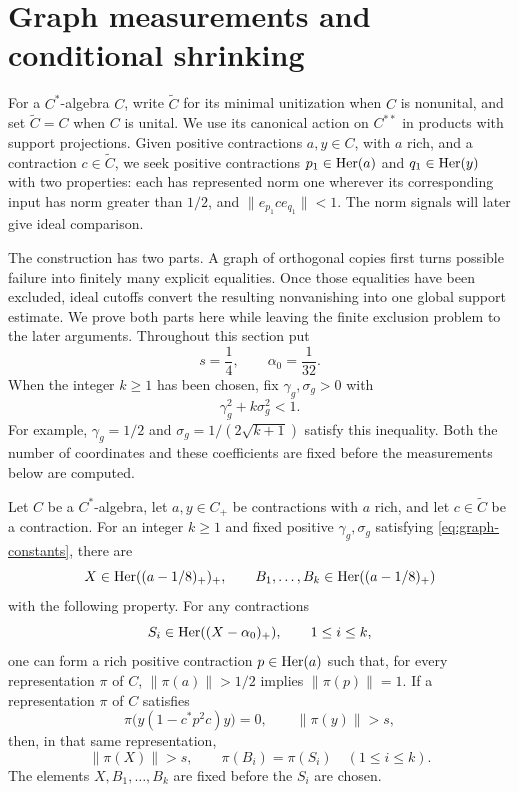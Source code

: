 \section{Graph measurements and conditional shrinking}\label{sec:graph}

For a \(C^*\)-algebra \(C\), write \(\widetilde C\) for its
minimal unitization when \(C\) is nonunital, and set
\(\widetilde C=C\) when \(C\) is unital.  We use its canonical
action on \(C^{**}\) in products with support projections.
Given positive contractions \(a,y\in C\), with \(a\) rich,
and a contraction \(c\in\widetilde C\), we seek positive
contractions \(p_1\in\operatorname{Her}(a)\) and \(q_1\in\operatorname{Her}(y)\) with two
properties: each has represented norm one wherever its corresponding
input has norm greater than \(1/2\), and
\(\|e_{p_1}ce_{q_1}\|<1\).  The norm signals will later give
ideal comparison.

The construction has two parts.  A graph of orthogonal copies
first turns possible failure into finitely many explicit equalities.
Once those equalities have been excluded, ideal cutoffs convert
the resulting nonvanishing into one global support estimate.
We prove both parts here while leaving the finite exclusion
problem to the later arguments.  Throughout this section put
\[
 s=\frac14,\qquad \alpha_0=\frac1{32}.
\]
When the integer \(k\ge1\) has been chosen, fix
\(\gamma_g,\sigma_g>0\) with
\begin{equation}\label{eq:graph-constants}
 \gamma_g^2+k\sigma_g^2<1.
\end{equation}
For example, \(\gamma_g=1/2\) and
\(\sigma_g=1/(2\sqrt{k+1})\) satisfy this inequality.  Both the
number of coordinates and these coefficients are fixed before
the measurements below are computed.

\begin{proposition}\label{prop:graph}
Let \(C\) be a \(C^*\)-algebra, let \(a,y\in C_+\) be
contractions with \(a\) rich, and let \(c\in\widetilde C\) be a
contraction.  For an integer \(k\ge1\) and fixed positive
\(\gamma_g,\sigma_g\) satisfying \eqref{eq:graph-constants},
there are
\[
 X\in\operatorname{Her}((a-1/8)_+)_+,\qquad
 B_1,\ldots,B_k\in\operatorname{Her}((a-1/8)_+)
\]
with the following property.  For any contractions
\[
 S_i\in\operatorname{Her}((X-\alpha_0)_+),\qquad 1\le i\le k,
\]
one can form a rich positive contraction \(p\in\operatorname{Her}(a)\) such
that, for every representation \(\pi\) of \(C\),
\(\|\pi(a)\|>1/2\) implies \(\|\pi(p)\|=1\).
If a representation \(\pi\) of \(C\) satisfies
\[
 \pi\bigl(y(1-c^*p^2c)y\bigr)=0,\qquad \|\pi(y)\|>s,
\]
then, in that same representation,
\begin{equation}\label{eq:graph-failure}
 \|\pi(X)\|>s,\qquad \pi(B_i)=\pi(S_i)\quad(1\le i\le k).
\end{equation}
The elements \(X,B_1,\ldots,B_k\) are fixed before the
\(S_i\) are chosen.
\end{proposition}

